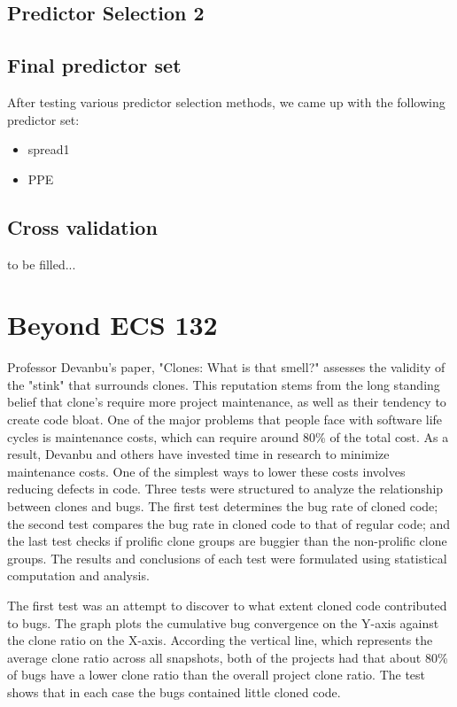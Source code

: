 \documentclass{article}
\begin{document}
\subsection{Predictor Selection 2}

\subsection{Final predictor set}

After testing various predictor selection methods, we came up with the following predictor set:
\begin{itemize}
	\item spread1
	\item PPE
\end{itemize}

\subsection{Cross validation}

to be filled...


\section{Beyond ECS 132}

Professor Devanbu's paper, "Clones: What is that smell?" assesses the validity of the "stink"
that surrounds clones.  This reputation stems from the long standing belief that clone's require
more project maintenance, as well as their tendency to create code bloat. One of the major
problems that people face with software life cycles is maintenance costs, which can require
around 80\% of the total cost. As a result, Devanbu and others have invested time in research
to minimize maintenance costs. One of the simplest ways to lower these costs involves
reducing defects in code. Three tests were structured to analyze the relationship between
clones and bugs. The first test determines the bug rate of cloned code; the second test
compares the bug rate in cloned code to that of regular code; and the last test checks
if prolific clone groups are buggier than the non-prolific clone groups. The results and
conclusions of each test were formulated using statistical computation and analysis.

The first test was an attempt to discover to what extent cloned code contributed to bugs.
The graph plots the cumulative bug convergence on the Y-axis against the clone ratio on the
X-axis. According the vertical line, which represents the average clone ratio across all
snapshots, both of the projects had that about 80\% of bugs have a lower clone ratio than
the overall project clone ratio. The test shows that in each case the bugs contained little
cloned code.
\end{document}
